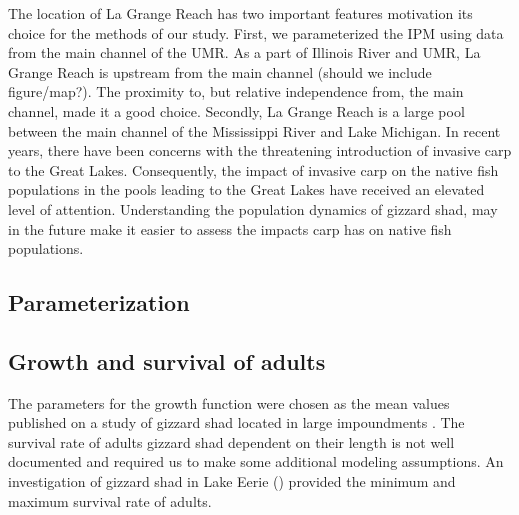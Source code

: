 \documentclass[preprint,review,12pt,authoryear]{elsarticle}
\begin{document}
The location of La Grange Reach has two important features motivation its choice for the methods of our study. 
First, we parameterized the IPM using data from the main channel of the UMR.  As a part of Illinois River and UMR, La Grange Reach is upstream from the main channel (should we include figure/map?).  
The proximity to, but relative independence from, the main channel, made it a good choice.  Secondly, La Grange Reach is a large pool between the main channel of the Mississippi River and Lake Michigan.  
In recent years, there have been concerns with the threatening introduction of invasive carp to the Great Lakes.  
Consequently, the impact of invasive carp on the native fish populations in the pools leading to the Great Lakes have received an elevated level of attention.  
Understanding the population dynamics of gizzard shad, may in the future make it easier to assess the impacts carp has on native fish populations.

\subsection{Parameterization}
\subsection{Growth and survival of adults}
The parameters for the growth function were chosen as the mean values published on a study of gizzard shad located in large impoundments \citep{michaletz2017variation}. 
The survival rate of adults gizzard shad dependent on their length is not well documented and required us to make some additional modeling assumptions.  
An investigation of gizzard shad in Lake Eerie (\cite{bodola1955life}) provided the minimum and maximum survival rate of adults. 
\end{document}
